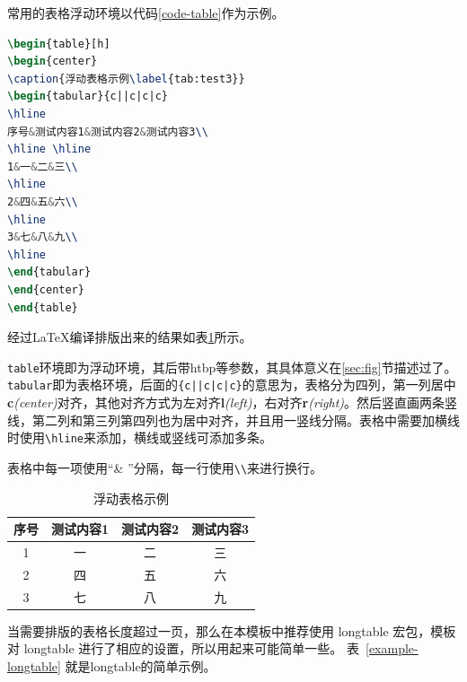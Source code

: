 常用的表格浮动环境以代码\ref{code-table}作为示例。

\begin{lstlisting}[caption={表格浮动环境},label={code-table},language={LaTeX}]
\begin{table}[h]
\begin{center}
\caption{浮动表格示例\label{tab:test3}}
\begin{tabular}{c||c|c|c}
\hline
序号&测试内容1&测试内容2&测试内容3\\
\hline \hline
1&一&二&三\\
\hline
2&四&五&六\\
\hline
3&七&八&九\\
\hline
\end{tabular}
\end{center}
\end{table}
\end{lstlisting}

经过\LaTeX{}编译排版出来的结果如表\ref{tab-test3}所示。

\texttt{table}环境即为浮动环境，其后带htbp等参数，其具体意义在\ref{sec:fig}节描述过了。\texttt{tabular}即为表格环境，后面的\texttt{\{c||c|c|c\}}的意思为，表格分为四列，第一列居中{\bf c}\textit{(center)}对齐，其他对齐方式为左对齐{\bf l}\textit{(left)}，右对齐{\bf r}\textit{(right)}。然后竖直画两条竖线，第二列和第三列第四列也为居中对齐，并且用一竖线分隔。表格中需要加横线时使用\texttt{\textbackslash hline}来添加，横线或竖线可添加多条。

表格中每一项使用“\& ”分隔，每一行使用\texttt{\textbackslash\textbackslash}来进行换行。
\begin{table}
\begin{center}
\caption{浮动表格示例\label{tab-test3}}
\begin{tabular}{c||c|c|c}
\hline
序号&测试内容1&测试内容2&测试内容3\\
\hline \hline
1&一&二&三\\
\hline
2&四&五&六\\
\hline
3&七&八&九\\
\hline
\end{tabular}
\end{center}
\end{table}
当需要排版的表格长度超过一页，那么在本模板中推荐使用 \textsf{longtable}
宏包，模板对 \textsf{longtable} 进行了相应的设置，所以用起来可能简单一些。
表~\ref{example-longtable} 就是\textsf{longtable}的简单示例。

